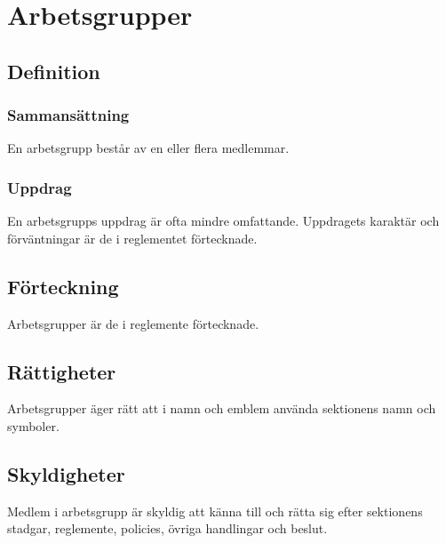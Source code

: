 \section{Arbetsgrupper}

\subsection{Definition}

\subsubsection{Sammansättning}
En arbetsgrupp består av en eller flera medlemmar.

\subsubsection{Uppdrag}
En arbetsgrupps uppdrag är ofta mindre omfattande. Uppdragets karaktär och förväntningar är de i reglementet förtecknade.

\subsection{Förteckning}
Arbetsgrupper är de i reglemente förtecknade.

\subsection{Rättigheter}
Arbetsgrupper äger rätt att i namn och emblem använda sektionens namn och symboler.

\subsection{Skyldigheter}
Medlem i arbetsgrupp är skyldig att känna till och rätta sig efter sektionens stadgar, reglemente, policies, övriga handlingar och beslut.
